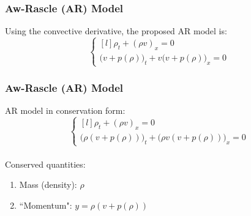 \documentclass{beamer}
\begin{document}
\begin{frame}
\frametitle{Aw-Rascle (AR) Model}

Using the convective derivative, the proposed AR model is: \\[1ex]

\[ \left\{ \begin{matrix*}[l] \rho_t + (\rho v)_x = 0 \\[2ex] \Big(v + p(\rho)\Big)_t + v\Big(v + p(\rho)\Big)_x = 0 \end{matrix*} \right. \]

\end{frame}

\begin{frame}
\frametitle{Aw-Rascle (AR) Model}

AR model in conservation form: \\[3ex]

\[ \left\{ \begin{matrix*}[l] \rho_t + (\rho v)_x = 0 \\[2ex] \Big(\rho (v + p(\rho)) \Big)_t + \Big(\rho v(v + p(\rho)) \Big)_x = 0 \end{matrix*} \right. \] \\[5ex]

Conserved quantities:
\begin{enumerate}
\item Mass (density): $\rho$
\item ``Momentum": $y = \rho(v + p(\rho))$
\end{enumerate}

\end{frame}
\end{document}
